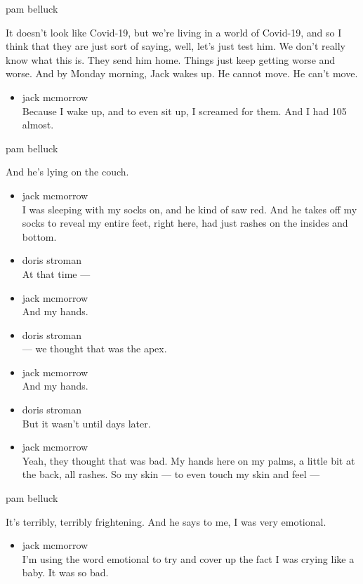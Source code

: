 pam belluck

It doesn't look like Covid-19, but we're living in a world of Covid-19,
and so I think that they are just sort of saying, well, let's just test
him. We don't really know what this is. They send him home. Things just
keep getting worse and worse. And by Monday morning, Jack wakes up. He
cannot move. He can't move.

\begin{itemize}
\tightlist
\item
  jack mcmorrow\\
  Because I wake up, and to even sit up, I screamed for them. And I had
  105 almost.
\end{itemize}

pam belluck

And he's lying on the couch.

\begin{itemize}
\item
  jack mcmorrow\\
  I was sleeping with my socks on, and he kind of saw red. And he takes
  off my socks to reveal my entire feet, right here, had just rashes on
  the insides and bottom.
\item
  doris stroman\\
  At that time ---
\item
  jack mcmorrow\\
  And my hands.
\item
  doris stroman\\
  --- we thought that was the apex.
\item
  jack mcmorrow\\
  And my hands.
\item
  doris stroman\\
  But it wasn't until days later.
\item
  jack mcmorrow\\
  Yeah, they thought that was bad. My hands here on my palms, a little
  bit at the back, all rashes. So my skin --- to even touch my skin and
  feel ---
\end{itemize}

pam belluck

It's terribly, terribly frightening. And he says to me, I was very
emotional.

\begin{itemize}
\tightlist
\item
  jack mcmorrow\\
  I'm using the word emotional to try and cover up the fact I was crying
  like a baby. It was so bad.
\end{itemize}

